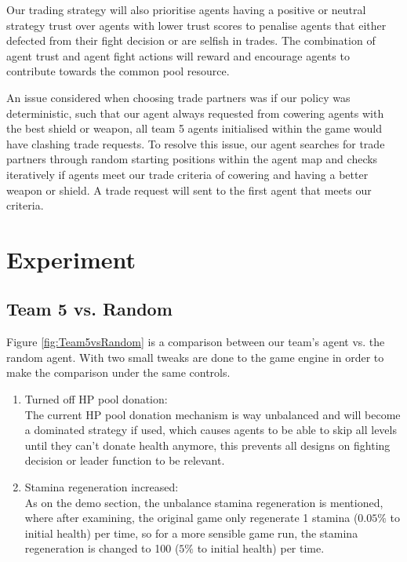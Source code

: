 Our trading strategy will also prioritise agents having a positive or neutral strategy trust over agents with lower trust scores to penalise agents that either defected from their fight decision or are selfish in trades. The combination of agent trust and agent fight actions will reward and encourage agents to contribute towards the common pool resource.

An issue considered when choosing trade partners was if our policy was deterministic, such that our agent always requested from cowering agents with the best shield or weapon, all team 5 agents initialised within the game would have clashing trade requests. To resolve this issue, our agent searches for trade partners through random starting positions within the agent map and checks iteratively if agents meet our trade criteria of cowering and having a better weapon or shield. A trade request will sent to the first agent that meets our criteria.

\section{Experiment}

\subsection{Team 5 vs. Random}
Figure \ref{fig:Team5vsRandom} is a comparison between our team's agent vs. the random agent. With two small tweaks are done to the game engine in order to make the comparison under the same controls.

\begin{enumerate}
    \item Turned off HP pool donation: \\
          The current HP pool donation mechanism is way unbalanced and will become a dominated strategy if used, which causes agents to be able to skip all levels until they can't donate health anymore, this prevents all designs on fighting decision or leader function to be relevant.
    \item Stamina regeneration increased: \\
          As on the demo section, the unbalance stamina regeneration is mentioned, where after examining, the original game only regenerate 1 stamina ($0.05\%$ to initial health) per time, so for a more sensible game run, the stamina regeneration is changed to 100 ($5\%$ to initial health) per time.
\end{enumerate}

